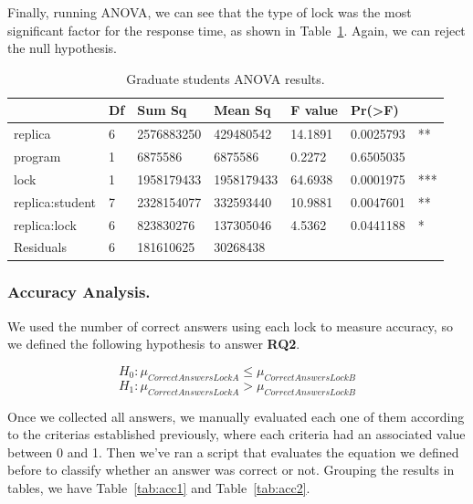 Finally, running ANOVA, we can see that the type of lock was the most significant factor for the response time, as shown in Table~\ref{tab:anova2}. Again, we can reject the null hypothesis.

\begin{table}
\begin{center}
\caption{Graduate students ANOVA results.}\label{tab:anova2}
\begin{tabular}{|l|l|l|l|l|ll|}
\hline
                 & Df &    Sum Sq &   Mean Sq  & F value &   Pr(>F) & \\   
\hline
replica          & 6 & 2576883250 &  429480542 & 14.1891 & 0.0025793 & **  \\
program          & 1 &    6875586 &    6875586 &  0.2272 & 0.6505035 &     \\
lock             & 1 & 1958179433 & 1958179433 & 64.6938 & 0.0001975 & *** \\
replica:student  & 7 & 2328154077 &  332593440 & 10.9881 & 0.0047601 & **  \\
replica:lock     & 6 &  823830276 &  137305046 &  4.5362 & 0.0441188 & *   \\
Residuals        & 6 &  181610625 &   30268438 &         &           &     \\
\hline
\end{tabular}
\end{center}
\end{table}

\subsubsection{Accuracy Analysis.}

We used the number of correct answers using each lock to measure accuracy, so we defined the following hypothesis to answer {\bf RQ2}. 

\begin{equation}
  H_{0} : \mu_{CorrectAnswersLockA} \leq \mu_{CorrectAnswersLockB}
\end{equation}
\begin{equation}
  H_{1} : \mu_{CorrectAnswersLockA} > \mu_{CorrectAnswersLockB}
\end{equation}

Once we collected all answers, we manually evaluated each one of them according to the criterias established previously, where each criteria had an associated value between 0 and 1. Then we've ran a script that evaluates the equation we defined before to classify whether an answer was correct or not. Grouping the results in tables, we have Table~\ref{tab:acc1} and Table~\ref{tab:acc2}.

